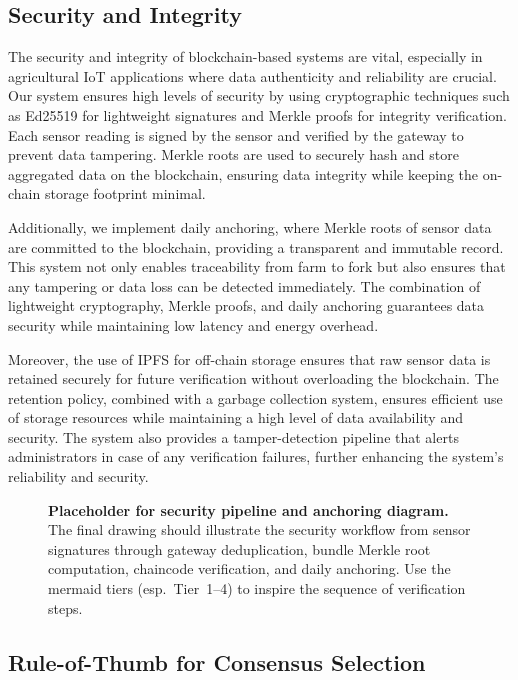 \documentclass[12pt,onecolumn]{IEEEtran} %
\begin{document}
\subsection{Security and Integrity}
\label{subsec:security-integrity}

The security and integrity of blockchain-based systems are vital, especially in agricultural IoT applications where data authenticity and reliability are crucial. Our system ensures high levels of security by using cryptographic techniques such as Ed25519 for lightweight signatures and Merkle proofs for integrity verification. Each sensor reading is signed by the sensor and verified by the gateway to prevent data tampering. Merkle roots are used to securely hash and store aggregated data on the blockchain, ensuring data integrity while keeping the on-chain storage footprint minimal.

Additionally, we implement daily anchoring, where Merkle roots of sensor data are committed to the blockchain, providing a transparent and immutable record. This system not only enables traceability from farm to fork but also ensures that any tampering or data loss can be detected immediately. The combination of lightweight cryptography, Merkle proofs, and daily anchoring guarantees data security while maintaining low latency and energy overhead.

Moreover, the use of IPFS for off-chain storage ensures that raw sensor data is retained securely for future verification without overloading the blockchain. The retention policy, combined with a garbage collection system, ensures efficient use of storage resources while maintaining a high level of data availability and security. The system also provides a tamper-detection pipeline that alerts administrators in case of any verification failures, further enhancing the system’s reliability and security.

\begin{figure}[h]
  \centering
  \caption{\textbf{Placeholder for security pipeline and anchoring diagram.} The final drawing should illustrate the security workflow from sensor signatures through gateway deduplication, bundle Merkle root computation, chaincode verification, and daily anchoring. Use the mermaid tiers (esp.~Tier~1–4) to inspire the sequence of verification steps.}
  \label{fig:security-pipeline}
\end{figure}

\subsection{Rule-of-Thumb for Consensus Selection}
\label{subsec:rule-of-thumb}
\end{document}
